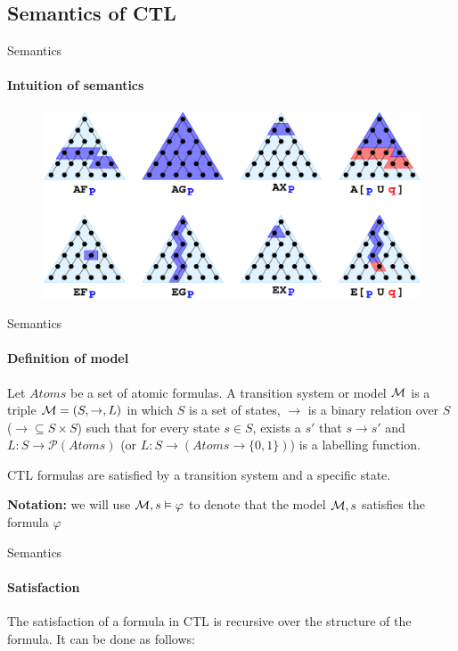 \subsection{Semantics of CTL}


\begin{frame}{Semantics}
    \framesubtitle{Intuition of semantics}
    \begin{figure}
        \includegraphics[scale=0.3]{images/tree_examples.png}
    \end{figure}
\end{frame}
\begin{frame}{Semantics}
	\framesubtitle{Definition of model}
	\begin{definition}
		Let $Atoms$ be a set of atomic formulas. A \alert{transition system} or \alert{model} $\mathcal{M}$ is a triple $\mathcal{M} = (S, \to, L)$ in which $S$ is a set of states, $\to$ is a binary relation over $S$ ($\to \subseteq S\times S$) such that for every state $s\in S$, exists a $s'$ that $s \to s'$ and $L: S \to \mathcal{P}(Atoms)$ (or $L: S \to (Atoms \to \{0,1\})$) is a labelling function.
	\end{definition}\pause
    CTL formulas are satisfied by a transition system and a specific state.
    
	{\bf Notation:} we will use $\mathcal{M},s\vDash \varphi$ to denote that the model $\mathcal{M},s$ satisfies the formula $\varphi$
\end{frame}

\begin{frame}{Semantics}
    \framesubtitle{Satisfaction}
    \begin{definition}
        The \alert{satisfaction} of a formula in CTL is recursive over the structure of the formula. It can be done as follows:
    \end{definition}
\end{frame}


